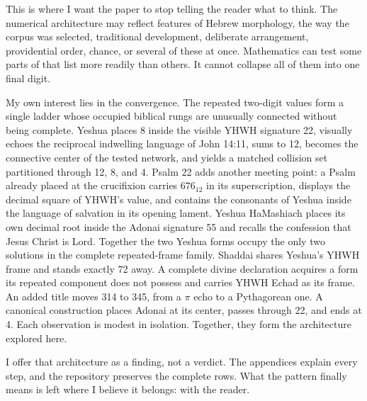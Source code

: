 This is where I want the paper to stop telling the reader what to think. The numerical architecture may reflect features of Hebrew morphology, the way the corpus was selected, traditional development, deliberate arrangement, providential order, chance, or several of these at once. Mathematics can test some parts of that list more readily than others. It cannot collapse all of them into one final digit.

My own interest lies in the convergence. The repeated two-digit values form a single ladder whose occupied biblical rungs are unusually connected without being complete. Yeshua places 8 inside the visible YHWH signature 22, visually echoes the reciprocal indwelling language of John 14:11, sums to 12, becomes the connective center of the tested network, and yields a matched collision set partitioned through 12, 8, and 4. Psalm 22 adds another meeting point: a Psalm already placed at the crucifixion carries $676_{12}$ in its superscription, displays the decimal square of YHWH's value, and contains the consonants of Yeshua inside the language of salvation in its opening lament. Yeshua HaMashiach places its own decimal root inside the Adonai signature 55 and recalls the confession that Jesus Christ is Lord. Together the two Yeshua forms occupy the only two solutions in the complete repeated-frame family. Shaddai shares Yeshua's YHWH frame and stands exactly 72 away. A complete divine declaration acquires a form its repeated component does not possess and carries YHWH Echad as its frame. An added title moves 314 to 345, from a $\pi$ echo to a Pythagorean one. A canonical construction places Adonai at its center, passes through 22, and ends at 4. Each observation is modest in isolation. Together, they form the architecture explored here.

I offer that architecture as a finding, not a verdict. The appendices explain every step, and the repository preserves the complete rows. What the pattern finally means is left where I believe it belongs: with the reader.
